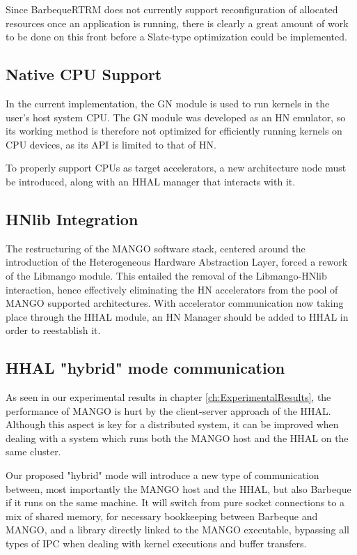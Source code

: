 Since BarbequeRTRM does not currently support reconfiguration of allocated resources once an application is running, there is clearly a great amount of work to be done on this front before a Slate-type optimization could be implemented.

\subsection{Native CPU Support}

In the current implementation, the GN module is used to run kernels in the user's host system CPU. The GN module was developed as an HN emulator, so its working method is therefore not optimized for efficiently running kernels on CPU devices, as its API is limited to that of HN.

To properly support CPUs as target accelerators, a new architecture node must be introduced, along with an HHAL manager that interacts with it.

\subsection{HNlib Integration}

The restructuring of the MANGO software stack, centered around the introduction of the Heterogeneous Hardware Abstraction Layer, forced a rework of the Libmango module. This entailed the removal of the Libmango-HNlib interaction, hence effectively eliminating the HN accelerators from the pool of MANGO supported architectures.
With accelerator communication now taking place through the HHAL module, an HN Manager should be added to HHAL in order to reestablish it.

\subsection{HHAL "hybrid" mode communication} \label{sub-sect:hhal-hybrid-mode}

As seen in our experimental results in chapter \ref{ch:ExperimentalResults}, the performance of MANGO is hurt by the client-server approach of the HHAL. Although this aspect is key for a distributed system, it can be improved when dealing with a system which runs both the MANGO host and the HHAL on the same cluster. 

Our proposed "hybrid" mode will introduce a new type of communication between, most importantly the MANGO host and the HHAL, but also Barbeque if it runs on the same machine. It will switch from pure socket connections to a mix of shared memory, for necessary bookkeeping between Barbeque and MANGO, and a library directly linked to the MANGO executable, bypassing all types of IPC when dealing with kernel executions and buffer transfers.

